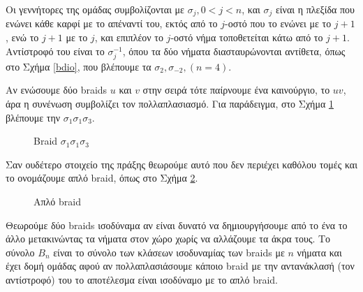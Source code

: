 Οι γεννήτορες της ομάδας  συμβολίζονται με $\sigma_{j},  0<j<n$, και $\sigma_{j}$ είναι η πλεξίδα που ενώνει κάθε καρφί με το απέναντί του, εκτός από το $j$-οστό που το ενώνει με το $j+1$, ενώ το $j+1$ με το $j$, και επιπλέον το $j$-οστό νήμα τοποθετείται κάτω από το $j+1$. Αντίστροφό του είναι το $\sigma_{j}^{-1}$, όπου τα δύο νήματα διασταυρώνονται αντίθετα, όπως στο Σχήμα \ref{bdio}, που βλέπουμε τα $\sigma_{2},\sigma_{-2}, (n=4)$.    


 Αν ενώσουμε δύο braids $ u $ και $ v $ στην σειρά τότε παίρνουμε ένα καινούργιο, το $ uv $, άρα η συνένωση συμβολίζει τον πολλαπλασιασμό. Για παράδειγμα, στο Σχήμα \ref{benaenatria} βλέπουμε την $\sigma_{1}\sigma_{1}\sigma_{3}$.

\begin{figure}[h]
\caption{Braid $ \sigma_{1}\sigma_{1}\sigma_3 $}
\label{benaenatria}
\end{figure}

Σαν ουδέτερο στοιχείο της πράξης θεωρούμε αυτό που δεν περιέχει καθόλου τομές και το ονομάζουμε απλό braid, όπως στο Σχήμα \ref{bempty}.

\begin{figure}[ht]
\caption{Απλό braid}
\label{bempty}
\end{figure}

 Θεωρούμε δύο braids ισοδύναμα αν είναι δυνατό να δημιουργήσουμε από το ένα το άλλο μετακινώντας τα νήματα στον χώρο χωρίς να αλλάζουμε τα άκρα τους. Το σύνολο $ B_n $ είναι το σύνολο των κλάσεων ισοδυναμίας των braids με $ n $ νήματα και έχει δομή ομάδας αφού αν πολλαπλασιάσουμε κάποιο braid με την αντανάκλασή (τον αντίστροφό) του το αποτέλεσμα είναι ισοδύναμο με το απλό braid. 


